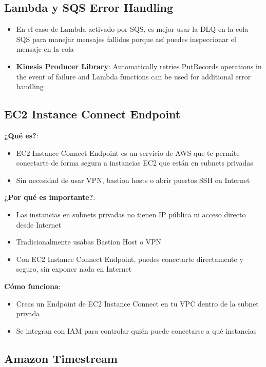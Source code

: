 \documentclass[12pt,a4paper]{report}
\begin{document}
\subsection{Lambda y SQS Error Handling}

\begin{itemize}
    \item En el caso de Lambda activado por SQS, es mejor usar la DLQ en la cola SQS para manejar mensajes fallidos porque así puedes inspeccionar el mensaje en la cola
    \item \textbf{Kinesis Producer Library}: Automatically retries PutRecords operations in the event of failure and Lambda functions can be used for additional error handling
\end{itemize}

\subsection{EC2 Instance Connect Endpoint}

\textbf{¿Qué es?}:
\begin{itemize}
    \item EC2 Instance Connect Endpoint es un servicio de AWS que te permite conectarte de forma segura a instancias EC2 que están en subnets privadas
    \item Sin necesidad de usar VPN, bastion hosts o abrir puertos SSH en Internet
\end{itemize}

\textbf{¿Por qué es importante?}:
\begin{itemize}
    \item Las instancias en subnets privadas no tienen IP pública ni acceso directo desde Internet
    \item Tradicionalmente usabas Bastion Host o VPN
    \item Con EC2 Instance Connect Endpoint, puedes conectarte directamente y seguro, sin exponer nada en Internet
\end{itemize}

\textbf{Cómo funciona}:
\begin{itemize}
    \item Creas un Endpoint de EC2 Instance Connect en tu VPC dentro de la subnet privada
    \item Se integran con IAM para controlar quién puede conectarse a qué instancias
\end{itemize}

\subsection{Amazon Timestream}
\end{document}
